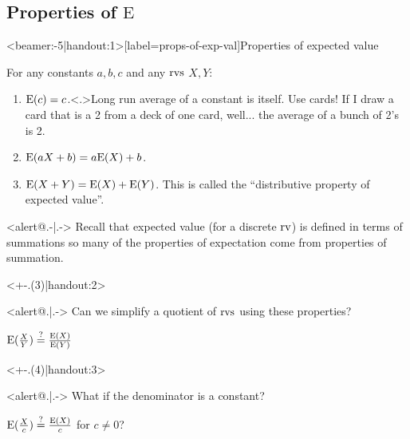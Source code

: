 \documentclass[english,notheorems]{beamer}\usepackage[]{graphicx}\usepackage[]{xcolor}
\newcommand{\omFinalAnswer}[1]{\textcolor<.>{orange} {#1}}
\newcommand{\answer}[1]{\rule[0.5ex]{1\columnwidth}{1pt}\par\nobreak A: #1}
\theoremstyle{definition}
\theoremstyle{plain}
\theoremstyle{remark}
\begin{document}
\subsection{Properties of $\mathrm{E}$}
\begin{frame}<beamer:-5|handout:1>[label=props-of-exp-val]{Properties of expected value}
\begin{block}{}
For any constants $a,b,c$ and any $\text{rvs}$ $X,Y$:
\end{block}
\begin{enumerate}
\item $\mathrm{E}(c)=c$.\note<.>{Long run average of a constant is itself. Use cards! If I draw a
card that is a 2 from a deck of one card, well... the average of a
bunch of 2's is 2.}
\item \label{prop:aX+b}$\mathrm{E}(aX+b)=a\mathrm{E}(X)+b$.
\item $\mathrm{E}(X+Y)=\mathrm{E}(X)+\mathrm{E}(Y)$. This is called the ``distributive property
of expected value''.
\end{enumerate}
\bigskip{}
\begin{overprint}
\begin{block}<alert@.-|.->{}
Recall that expected value (for a discrete $\text{rv}$) is defined in
terms of summations so many of the properties of expectation come
from properties of summation.
\end{block}
\onslide<+-.(3)|handout:2> 
\begin{block}<alert@.|.->{}
Can we simplify a quotient of $\text{rvs}$ using these properties?
\end{block}
\begin{omx}
$\mathrm{E}(\frac{X}{Y})\overset{?}{=}\frac{\mathrm{E}(X)}{\mathrm{E}(Y)}$
\end{omx}
\onslide<+-.(4)|handout:3> 
\begin{block}<alert@.|.->{}
What if the denominator is a constant?
\end{block}
\begin{omx}
$\mathrm{E}(\frac{X}{c})\overset{?}{=}\frac{\mathrm{E}(X)}{c}$ for $c\ne0$?
\end{omx}
\end{overprint}
\end{frame}
\end{document}
